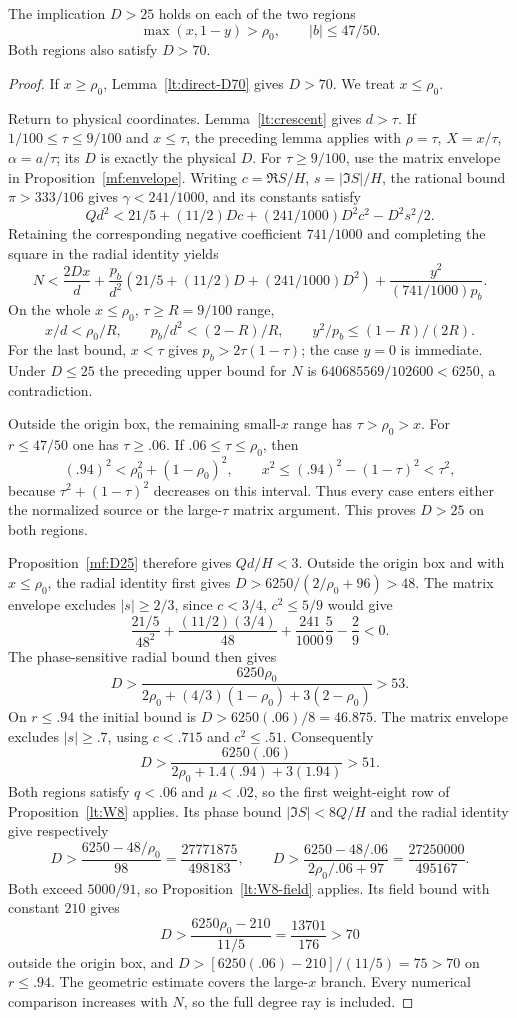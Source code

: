 \begin{lemma}\label{sm:first-D25}
The implication $D>25$ holds on each of the two regions
\[
 \max(x,1-y)>\rho_0,\qquad |b|\le47/50.
\]
Both regions also satisfy $D>70$.
\end{lemma}
\begin{proof}
If $x\ge\rho_0$, Lemma~\ref{lt:direct-D70} gives $D>70$.
We treat $x\le\rho_0$.

Return to physical coordinates. Lemma~\ref{lt:crescent} gives
$d>\tau$. If $1/100\le\tau\le9/100$ and $x\le\tau$, the
preceding lemma applies with $\rho=\tau$, $X=x/\tau$,
$\alpha=a/\tau$; its $D$ is exactly the physical $D$.
For $\tau\ge9/100$, use the matrix envelope in
Proposition~\ref{mf:envelope}. Writing $c=\Re S/H$,
$s=|\Im S|/H$, the rational bound $\pi>333/106$ gives
$\gamma<241/1000$, and its constants satisfy
\[
 Qd^2<21/5+(11/2)Dc+(241/1000)D^2c^2-D^2s^2/2.
\]
Retaining the corresponding negative coefficient $741/1000$ and
completing the square in the radial identity yields
\[
 N<\frac{2Dx}{d}+\frac{p_b}{d^2}
       \left(21/5+(11/2)D+(241/1000)D^2\right)
       +\frac{y^2}{(741/1000)p_b}.
\]
On the whole $x\le\rho_0$, $\tau\ge R=9/100$ range,
\[
 x/d<\rho_0/R,\qquad p_b/d^2<(2-R)/R,\qquad
 y^2/p_b\le(1-R)/(2R).
\]
For the last bound, $x<\tau$ gives $p_b>2\tau(1-\tau)$;
the case $y=0$ is immediate. Under $D\le25$ the preceding upper
bound for $N$ is $640685569/102600<6250$, a contradiction.

Outside the origin box, the remaining small-$x$ range has
$\tau>\rho_0>x$. For $r\le47/50$ one has $\tau\ge.06$.
If $.06\le\tau\le\rho_0$, then
\[
 (.94)^2<\rho_0^2+(1-\rho_0)^2,\qquad
 x^2\le(.94)^2-(1-\tau)^2<\tau^2,
\]
because $\tau^2+(1-\tau)^2$ decreases on this interval.
Thus every case enters either the normalized source or the
large-$\tau$ matrix argument. This proves $D>25$ on both regions.

Proposition~\ref{mf:D25} therefore gives $Qd/H<3$.
Outside the origin box and with $x\le\rho_0$, the radial identity
first gives $D>6250/(2/\rho_0+96)>48$. The matrix envelope excludes
$|s|\ge2/3$, since $c<3/4$, $c^2\le5/9$ would give
\[
 \frac{21/5}{48^2}+\frac{(11/2)(3/4)}{48}
       +\frac{241}{1000}\frac59-\frac29<0.
\]
The phase-sensitive radial bound then gives
\[
 D>\frac{6250\rho_0}{2\rho_0+(4/3)(1-\rho_0)+3(2-\rho_0)}>53.
\]
On $r\le.94$ the initial bound is $D>6250(.06)/8=46.875$.
The matrix envelope excludes $|s|\ge.7$, using $c<.715$ and
$c^2\le.51$. Consequently
\[
 D>\frac{6250(.06)}{2\rho_0+1.4(.94)+3(1.94)}>51.
\]
Both regions satisfy $q<.06$ and $\mu<.02$, so the first
weight-eight row of Proposition~\ref{lt:W8} applies.
Its phase bound $|\Im S|<8Q/H$ and the radial identity give respectively
\[
 D>\frac{6250-48/\rho_0}{98}
   =\frac{27771875}{498183},\qquad
 D>\frac{6250-48/.06}{2\rho_0/.06+97}
   =\frac{27250000}{495167}.
\]
Both exceed $5000/91$, so Proposition~\ref{lt:W8-field} applies.
Its field bound with constant $210$ gives
\[
 D>\frac{6250\rho_0-210}{11/5}=\frac{13701}{176}>70
\]
outside the origin box, and $D>[6250(.06)-210]/(11/5)=75>70$
on $r\le.94$. The geometric estimate covers the large-$x$ branch.
Every numerical comparison increases with $N$, so the full degree
ray is included.
\end{proof}

